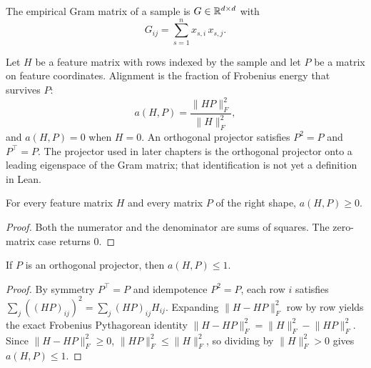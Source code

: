 \begin{definition}\label{def:gram}
\leanok
{}
The empirical Gram matrix of a sample is $G\in\mathbb{R}^{d\times d}$ with
\[
G_{ij} = \sum_{s=1}^n x_{s,i}\, x_{s,j}.
\]
\end{definition}

\begin{definition}[Alignment]\label{def:alignment}
\leanok
{}
Let $H$ be a feature matrix with rows indexed by the sample and let $P$ be a matrix on feature coordinates. Alignment is the fraction of Frobenius energy that survives $P$:
\[
a(H,P) = \frac{\lVert HP\rVert_F^2}{\lVert H\rVert_F^2},
\]
and $a(H,P)=0$ when $H=0$. An orthogonal projector satisfies $P^2=P$ and $P^\top=P$. The projector used in later chapters is the orthogonal projector onto a leading eigenspace of the Gram matrix; that identification is not yet a definition in Lean.
\end{definition}

\begin{lemma}\label{lem:alignment_nonneg}
\leanok
{}
For every feature matrix $H$ and every matrix $P$ of the right shape, $a(H,P)\ge 0$.
\end{lemma}
\begin{proof}
\leanok
Both the numerator and the denominator are sums of squares. The zero-matrix case returns $0$.
\end{proof}

\begin{lemma}\label{lem:alignment_le_one}
\leanok
{}
If $P$ is an orthogonal projector, then $a(H,P)\le 1$.
\end{lemma}
\begin{proof}
\leanok
By symmetry $P^\top=P$ and idempotence $P^2=P$, each row $i$ satisfies $\sum_j ((HP)_{ij})^2 = \sum_j (HP)_{ij} H_{ij}$. Expanding $\lVert H - HP\rVert_F^2$ row by row yields the exact Frobenius Pythagorean identity $\lVert H - HP\rVert_F^2 = \lVert H\rVert_F^2 - \lVert HP\rVert_F^2$. Since $\lVert H - HP\rVert_F^2 \ge 0$, $\lVert HP\rVert_F^2 \le \lVert H\rVert_F^2$, so dividing by $\lVert H\rVert_F^2 > 0$ gives $a(H,P)\le 1$.
\end{proof}

